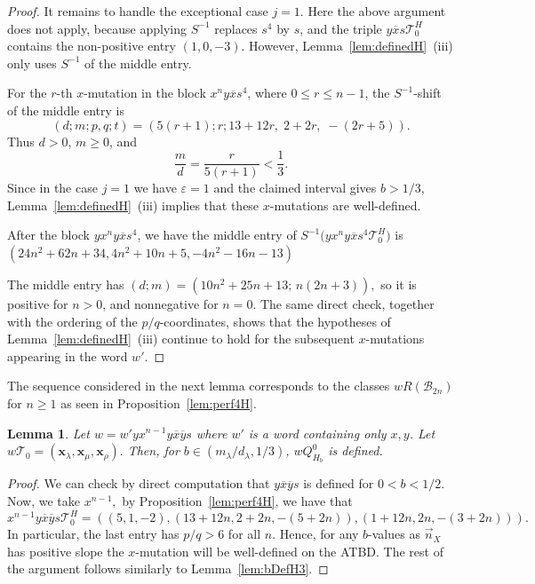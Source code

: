 \documentclass[11pt, reqno]{amsart}
\newtheorem{lemma}[thm]{Lemma}
\theoremstyle{remark}
\numberwithin{equation}{subsection}
\numberwithin{figure}{section}
\theoremstyle{customremark}
\newcommand{\Tt}{\mathcal{T}}
\newcommand{\vn}{{\vec{n}}}
\newcommand{\ov}{\overline}
\newcommand{\la}{{\lambda}}
\newcommand{\eps}{\varepsilon}
\begin{document}
\begin{proof}
It remains to handle the exceptional case \(j=1\). Here the above argument
does not apply, because applying \(S^{-1}\) replaces \(s^4\) by \(s\), and
the triple \(y\ov{x}s\Tt_0^H\) contains the non-positive entry $(1,0,-3)$. However, Lemma~\ref{lem:definedH}~(iii) only uses \(S^{-1}\) of the middle
entry.

For the \(r\)-th \(x\)-mutation in the block \(x^ny\ov{x}s^4\), where
\(0\le r\le n-1\), the \(S^{-1}\)-shift of the middle entry is
\[
       (d;m;p,q;t)= (5(r+1);r;13+12r,\;2+2r,\;-(2r+5)).
\]
Thus \(d>0\), \(m\ge0\), and
\[
        \frac{m}{d}=\frac{r}{5(r+1)}<\frac13.
\]
Since in the case \(j=1\) we have \(\eps=1\) and the claimed interval
gives \(b>1/3\), Lemma~\ref{lem:definedH}~(iii) implies that these
\(x\)-mutations are well-defined.

After the block \(yx^ny\ov{x}s^4\), we have the middle entry of $S^{-1}\big(yx^ny\ov{x}s^4\Tt_0^H\big)$ is $(24n^2+62n+34,4n^2+10n+5,-4n^2-16n-13)$

The middle entry has $(d;m)=(10n^2+25n+13;\, n(2n+3)),$
so it is positive for \(n>0\), and nonnegative for \(n=0\). The same
direct check, together with the ordering of the \(p/q\)-coordinates, shows
that the hypotheses of Lemma~\ref{lem:definedH}~(iii) continue to hold for
the subsequent \(x\)-mutations appearing in the word \(w'\).
	 
\end{proof}

The sequence considered in the next lemma corresponds to the classes $wR(\mathcal{B}_{2n})$ for $n \geq 1$ as seen in Proposition~\ref{lem:perf4H}. 
\begin{lemma} \label{lem:bDefH4}
Let $w=w'yx^{n-1}y\ov{x}\ov{y}s$ where $w'$ is a word containing only $x,y$. Let $w\Tt_0=(\bm{x}_\la,\bm{x}_\mu,\bm{x}_\rho).$ Then, for $b \in (m_\la/d_\la,1/3)$, $wQ_{H_b}^0$ is defined. 
\end{lemma}
\begin{proof}
	We can check by direct computation that $y\ov{x}\ov{y}s$ is defined for $0< b<1/2$. Now, we take $x^{n-1},$ by Proposition~\ref{lem:perf4H}, we have that 
    \[ x^{n-1}y\ov{x}\ov{y}s\Tt_0^H=\left((5,1,-2),(13+12n,2+2n,-(5+2n)),(1+12n,2n,-(3+2n))\right).\]
    In particular, the last entry has $p/q>6$ for all $n.$ Hence, for any $b$-values as $\vn_X$ has positive slope the $x$-mutation will be well-defined on the ATBD. The rest of the argument follows similarly to Lemma~\ref{lem:bDefH3}. 
   
  
\end{proof}
\end{document}
